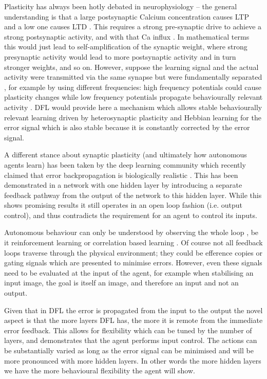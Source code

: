 \documentclass{aamas2017}
\begin{document}
Plasticity has always been hotly debated in neurophysiology -- the
general understanding is that a large postsynaptic Calcium
concentration causes LTP \cite{Malenka99,Bennett2000} and a low one
causes LTD \cite{Mulkey1992}. This requires a strong pre-synaptic
drive to achieve a strong postsynaptic activity, and with that Ca
influx \cite{Meunier2017}. In mathematical terms this would just lead
to self-amplification of the synaptic weight, where strong presynaptic
activity would lead to more postsynaptic activity and in turn stronger
weights, and so on. However, suppose the learning signal and the
actual activity were transmitted via the same synapse but were
fundamentally separated \cite{Lindsay2017}, for example by using
different frequencies: high frequency potentials could cause
plasticity changes while low frequency potentials propagate
behaviourally relevant activity \cite{Canolty2010}. DFL would provide
here a mechanism which allows stable behaviourally relevant learning
driven by heterosynaptic plasticity and Hebbian learning for the error
signal which is also stable because it is constantly corrected by the
error signal.

A different stance about synaptic plasticity (and ultimately how
autonomous agents learn) has been taken by the deep learning community
which recently claimed that error backpropagation is biologically
realistic \cite{Lillicrap2016,Roelfsema2018}. This has been
demonstrated in a network with one hidden layer by introducing a
separate feedback pathway from the output of the network to this
hidden layer. While this shows promising results it still operates in
an open loop fashion (i.e. output control), and thus contradicts the
requirement for an agent to control its inputs.

Autonomous behaviour can only be understood by observing the whole
loop \cite{Porr2005kyb}, be it reinforcement learning \cite{Sutton98}
or correlation based learning \cite{Verschure91}. Of course not all
feedback loops traverse through the physical environment; they could
be efference copies \cite{Uexkuell26,Graesser86} or gating signals
which are presented to minimise errors. However, even these signals
need to be evaluated at the input of the agent, for example when
stabilising an input image, the goal is itself an image, and therefore
an input and not an output.

Given that in DFL the error is propagated from the input to the output
the novel aspect is that the more layers DFL has, the more it is remote
from the immediate error feedback. This allows for flexibility which
can be tuned by the number of layers, and demonstrates that the agent
performs input control. The actions can be substantially varied as long as
the error signal can be minimised and will be more pronounced with
more hidden layers. In other words the more hidden layers we have the
more behavioural flexibility the agent will show.




\end{document}
